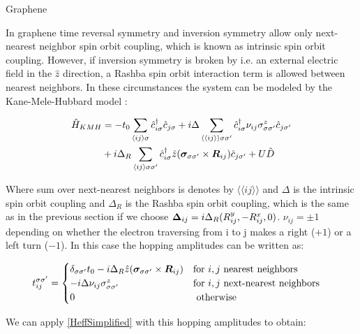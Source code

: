 \begin{section}{Graphene}

In graphene time reversal symmetry and inversion symmetry allow only next-nearest neighbor spin orbit coupling, which is known as intrinsic spin orbit coupling. However, if inversion symmetry is broken by i.e. an external electric field in the $\hat{z}$ direction, a Rashba spin orbit interaction term is allowed between nearest neighbors. In these circumstances the system can be modeled by the Kane-Mele-Hubbard model \cite{Laubach2014}:

\begin{align}
\hat{H}_{KMH} &= -t_0\sum_{\langle i j \rangle \sigma} \hat{c}^{\dagger}_{i\sigma}\hat{c}_{j\sigma} + i\Delta \sum_{\langle \langle i j \rangle \rangle \sigma \sigma'} \hat{c}^{\dagger}_{i\sigma} \nu_{ij} \sigma^z_{\sigma \sigma'} \hat{c}_{j\sigma'} \nonumber \\
&+ i\Delta_R \sum_{\langle i j \rangle \sigma \sigma'} \hat{c}^{\dagger}_{i\sigma} \hat{z}(\boldsymbol{\sigma}_{\sigma \sigma'} \times \boldsymbol{R}_{ij}) \hat{c}_{j\sigma'} + U\hat{D}
\end{align}

Where sum over next-nearest neighbors is denotes by $\langle \langle i j \rangle \rangle$ and $\Delta$ is the intrinsic spin orbit coupling and $\Delta_R$ is the Rashba spin orbit coupling, which is the same as in the previous section if we choose $\boldsymbol{\Delta}_{ij} = i\Delta_R (R_{ij}^y, - R_{ij}^x, 0)$. $\nu_{ij}=\pm 1$ depending on whether the electron traversing from i to j makes a right ($+1$) or a left turn ($-1$). In this case the hopping amplitudes can be written as:

\begin{equation}
\label{HoppHubbSOI}
t_{ij}^{\sigma \sigma'} = \begin{cases}
	\delta_{\sigma \sigma'}t_0- i\Delta_R \hat{z}(\boldsymbol{\sigma}_{\sigma \sigma'} \times \boldsymbol{R}_{ij}) & \text{for } i, j \text{ nearest neighbors} \\
	-i\Delta \nu_{ij} \sigma_{\sigma \sigma'}^z & \text{for } i, j \text{ next-nearest neighbors} \\
	0 & \text{ otherwise}
\end{cases} \quad
\end{equation}

We can apply \ref{HeffSimplified} with this hopping amplitudes to obtain:


\end{section}
